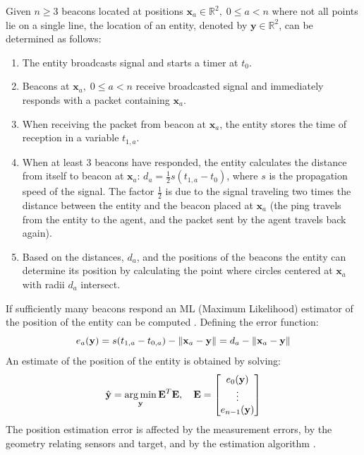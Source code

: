 Given $n\geq 3$ beacons located at positions $\mathbf{x}_{a}\in\mathbb{R}^{2},\; 0\leq a<n$ where not all points
lie on a single line, the location 
of an entity, denoted by $\mathbf{y}\in\mathbb{R}^{2}$, can be determined as follows:
\begin{enumerate}
  \item The entity broadcasts signal and starts a timer at $t_{0}$.
  \item Beacons at $\mathbf{x}_{a},\; 0\leq a<n$ receive broadcasted signal and immediately responds with a packet containing $\mathbf{x}_{a}$.
  \item When receiving the packet from beacon at $\mathbf{x}_{a}$, the entity stores the time of reception in a variable $t_{1, a}$.
  \item When at least 3 beacons have responded, the entity calculates the distance
  from itself to beacon at $\mathbf{x}_{a}$: $d_{a} = \frac{1}{2}s(t_{1, a} - t_{0})$, where $s$ is the propagation speed of the signal. The factor $\frac{1}{2}$ is due to the signal traveling
  two times the distance between the entity and the beacon placed at $\mathbf{x}_{a}$ (the ping travels from the entity to the agent, and the packet
  sent by the agent travels back again).
  \item Based on the distances, $d_{a}$, and the positions of the beacons the entity can
  determine its position by calculating the point where circles centered at $\mathbf{x}_{a}$ with radii $d_{a}$ intersect.
\end{enumerate}
If sufficiently many beacons respond an ML (Maximum Likelihood) estimator of the position of the entity can be computed \cite{10.1145/381677.381693}.
Defining the error function:\begin{equation}
  e_{a}(\mathbf{y}) = s(t_{1, a} - t_{0, a}) - \left\lVert\mathbf{x}_{a} - \mathbf{y}\right\rVert = d_{a} - \left\lVert\mathbf{x}_{a} - \mathbf{y}\right\rVert
\end{equation}
An estimate of the position of the entity is obtained by solving:
\begin{equation}
  \hat{\mathbf{y}} = \operatorname*{arg\,min}_{\mathbf{y}} \mathbf{E}^{T}\mathbf{E},\quad\mathbf{E} = \begin{bmatrix}
    e_{0}(\mathbf{y})\\
    \vdots\\
    e_{n-1}(\mathbf{y})
  \end{bmatrix}
\end{equation}
The position estimation error is affected by the measurement errors, by the geometry relating sensors and target, and by the estimation algorithm \cite{trilat_error}.
